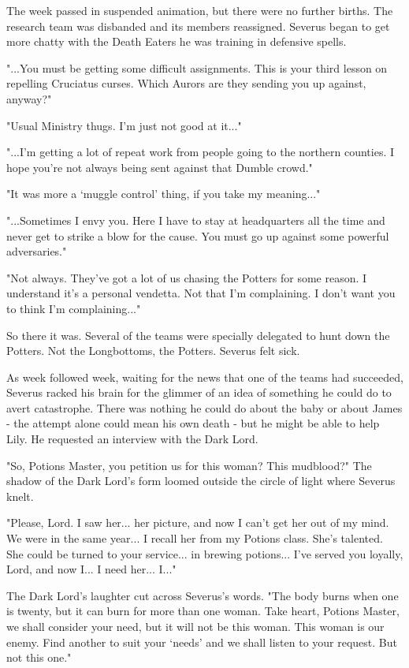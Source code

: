 \documentclass[a4paper,11pt]{article}
\begin{document}
The week passed in suspended animation, but there were no further births. The research team was disbanded and its members reassigned. Severus began to get more chatty with the Death Eaters he was training in defensive spells.

"...You must be getting some difficult assignments. This is your third lesson on repelling Cruciatus curses. Which Aurors are they sending you up against, anyway?"

"Usual Ministry thugs. I'm just not good at it..."

"...I'm getting a lot of repeat work from people going to the northern counties. I hope you're not always being sent against that Dumble crowd."

"It was more a `muggle control' thing, if you take my meaning..."

"...Sometimes I envy you. Here I have to stay at headquarters all the time and never get to strike a blow for the cause. You must go up against some powerful adversaries."

"Not always. They've got a lot of us chasing the Potters for some reason. I understand it's a personal vendetta. Not that I'm complaining. I don't want you to think I'm complaining..."

So there it was. Several of the teams were specially delegated to hunt down the Potters. Not the Longbottoms, the Potters. Severus felt sick.

As week followed week, waiting for the news that one of the teams had succeeded, Severus racked his brain for the glimmer of an idea of something he could do to avert catastrophe. There was nothing he could do about the baby or about James - the attempt alone could mean his own death - but he might be able to help Lily. He requested an interview with the Dark Lord.

"So, Potions Master, you petition us for this woman? This mudblood?" The shadow of the Dark Lord's form loomed outside the circle of light where Severus knelt.

"Please, Lord. I saw her... her picture, and now I can't get her out of my mind. We were in the same year... I recall her from my Potions class. She's talented. She could be turned to your service... in brewing potions... I've served you loyally, Lord, and now I... I need her... I..."

The Dark Lord's laughter cut across Severus's words. "The body burns when one is twenty, but it can burn for more than one woman. Take heart, Potions Master, we shall consider your need, but it will not be this woman. This woman is our enemy. Find another to suit your `needs' and we shall listen to your request. But not this one."
\end{document}
